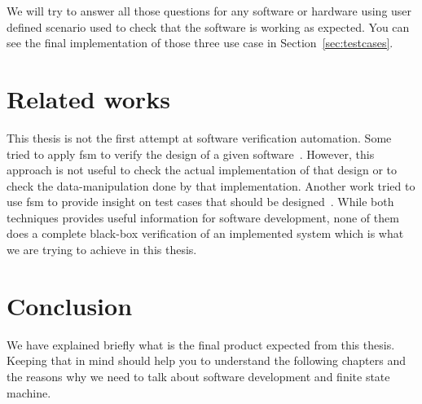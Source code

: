 \documentclass[12pt]{article}
\theoremstyle{definition}
\theoremstyle{definition}
\theoremstyle{remark}
\begin{document}
We will try to answer all those questions for any software or hardware using user defined scenario used to check that the software is working as expected. You can see the final implementation of those three use case in Section~\ref{sec:testcases}.



\section{Related works}


This thesis is not the first attempt at software verification automation. Some tried to apply \gls{fsm} to verify the design of a given software~\cite{Chow:1978:TSD:1313335.1313730}. However, this approach is not useful to check the actual implementation of that design or to check the data-manipulation done by that implementation. Another work tried to use \gls{fsm} to provide insight on test cases that should be designed~\cite{10.1007/978-3-540-39929-2_3}. While both techniques provides useful information for software development, none of them does a complete black-box verification of an implemented system which is what we are trying to achieve in this thesis.


\section{Conclusion}


We have explained briefly what is the final product expected from this thesis. Keeping that in mind should help you to understand the following chapters and the reasons why we need to talk about software development and finite state machine.


\end{document}

